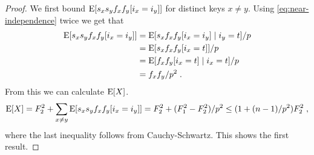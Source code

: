 \begin{proof}
    We first bound $\operatorname*{E}[s_x s_y f_x f_y [i_x = i_y]]$ for distinct keys
    $x \neq y$. Using \cref{eq:near-independence} twice we get that
    \begin{equation}\begin{split}\label{eq:twice-split}
        \operatorname*{E}[s_x s_y f_x f_y [i_x = i_y]]
            &= \operatorname*{E}[s_x f_x f_y [i_x = i_y] \mid i_y = t]/p
            \\&= \operatorname*{E}[s_x f_x f_y [i_x = t]]/p
            \\&= \operatorname*{E}[f_x f_y [i_x = t] \mid i_x = t]/p
            \\&= f_x f_y / p^2 \; .
    \end{split}\end{equation}
    From this we can calculate $\operatorname*{E}[X]$.
    \begin{align*}
        \operatorname*{E}[X]
            = F_2^2 + \sum_{x \neq y} \operatorname*{E}[s_x s_y f_x f_y [i_x = i_y]]
            = F_2^2 + (F_1^2 - F_2^2)/p^2
            \le (1 + (n - 1)/p^2)F_2^2 \; ,
    \end{align*}
    where the last inequality follows from Cauchy-Schwartz. This shows the first result.


\end{proof}
